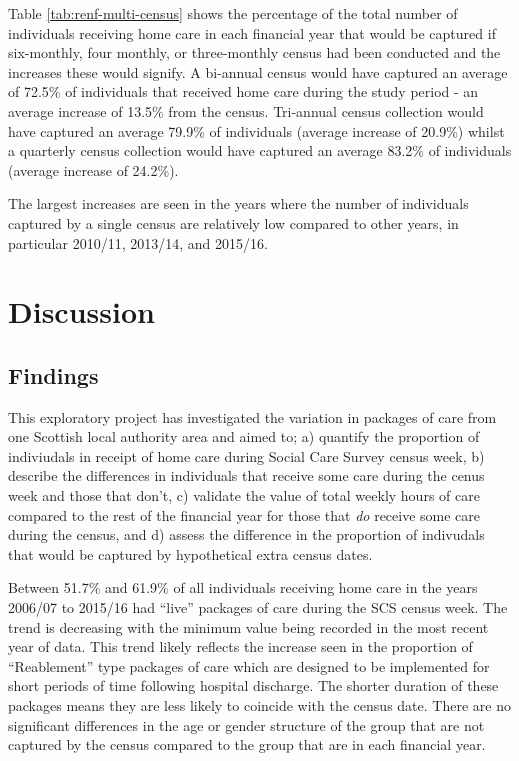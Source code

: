 \documentclass[]{article}
\begin{document}
Table \ref{tab:renf-multi-census} shows the percentage of the total
number of individuals receiving home care in each financial year that
would be captured if six-monthly, four monthly, or three-monthly census
had been conducted and the increases these would signify. A bi-annual
census would have captured an average of 72.5\% of individuals that
received home care during the study period - an average increase of
13.5\% from the census. Tri-annual census collection would have captured
an average 79.9\% of individuals (average increase of 20.9\%) whilst a
quarterly census collection would have captured an average 83.2\% of
individuals (average increase of 24.2\%).

The largest increases are seen in the years where the number of
individuals captured by a single census are relatively low compared to
other years, in particular 2010/11, 2013/14, and 2015/16.

\section{Discussion}\label{sec:renf-discuss}\subsection{Findings}\label{subsec:renf-discuss-find}

This exploratory project has investigated the variation in packages of
care from one Scottish local authority area and aimed to; a) quantify
the proportion of indiviudals in receipt of home care during Social Care
Survey census week, b) describe the differences in individuals that
receive some care during the cenus week and those that don't, c)
validate the value of total weekly hours of care compared to the rest of
the financial year for those that \emph{do} receive some care during the
census, and d) assess the difference in the proportion of indivudals
that would be captured by hypothetical extra census dates.

Between 51.7\% and 61.9\% of all individuals receiving home care in the
years 2006/07 to 2015/16 had ``live'' packages of care during the SCS
census week. The trend is decreasing with the minimum value being
recorded in the most recent year of data. This trend likely reflects the
increase seen in the proportion of ``Reablement'' type packages of care
which are designed to be implemented for short periods of time following
hospital discharge. The shorter duration of these packages means they
are less likely to coincide with the census date. There are no
significant differences in the age or gender structure of the group that
are not captured by the census compared to the group that are in each
financial year.
\end{document}
